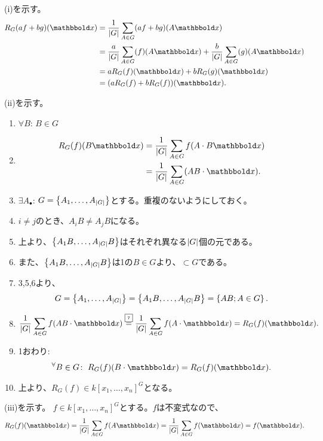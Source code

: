 \begin{myproof}
  (i)を示す。
  \begin{align}
    R_G(af+bg)(\bbold x)
    &=
    \frac{1}{\myabs{G}}\sum_{A\in G}(af+bg)(A\bbold x)\\
    &=
    \frac{a}{\myabs{G}}\sum_{A\in G}(f)(A\bbold x)
    +
    \frac{b}{\myabs{G}}\sum_{A\in G}(g)(A\bbold x)
    \\
    &=
    a R_G(f)(\bbold x) + b R_G(g)(\bbold x)\\
    &=
    (aR_G(f) + bR_G(f))(\bbold x).
  \end{align}

  (ii)を示す。
  \begin{enumerate}[label]
    \item
    $\forall B$: $B\in G$
    \item
    \begin{align}
      R_G(f)(B\bbold x)
      &=
      \frac{1}{\myabs{G}}\sum_{A\in G}f(A\cdot B\bbold x)\\
      &=
      \frac{1}{\myabs{G}}\sum_{A\in G}(AB\cdot \bbold x).
    \end{align}
    \item
    $\exists A_\bullet$: $G=\left\{A_1,\dots,A_{\left|G\right|}\right\}$とする。重複のないようにしておく。
    \item
    $i\neq j$のとき、$A_i B \neq A_j B$になる。
    \item
    上より、$\left\{A_1 B,\dots,A_{\left|G\right|}B\right\}$はそれぞれ異なる$\left|G\right|$個の元である。
    \item
    また、$\left\{A_1 B,\dots,A_{\left|G\right|}B\right\}$は1の$B\in G$より、$\subset G$である。
    \item
    3,5,6より、
    \begin{align}
      G=\left\{A_1,\dots,A_{\left|G\right|}\right\}
      =
      \left\{A_1 B,\dots,A_{\left|G\right|} B\right\}
      =
      \left\{AB; A\in G\right\}.
    \end{align}
    \item
    \begin{align}
      \frac{1}{\myabs{G}}\sum_{A\in G}f(AB\cdot \bbold x)
      \desceq{7}
      \frac{1}{\myabs{G}}\sum_{A\in G}f(A\cdot \bbold x)
      =
      R_G(f)(\bbold x).
    \end{align}
    \item
    1おわり:
    \begin{align}
      \Forall{B\in G} R_G(f)(B\cdot \bbold x) = R_G(f)(\bbold x).
    \end{align}
    \item
    上より、$R_G(f) \in k[x_1,\dots,x_n]^G$となる。
  \end{enumerate}

  (iii)を示す。
  $f\in k[x_1,\dots,x_n]^G$とする。$f$は不変式なので、
  \begin{align}
    R_G(f)(\bbold x)
    =
    \frac{1}{\myabs{G}}\sum_{A\in G}f(A\bbold x)
    =
    \frac{1}{\myabs{G}}\sum_{A\in G}f(\bbold x)
    =
    f(\bbold x).
  \end{align}
\end{myproof}


